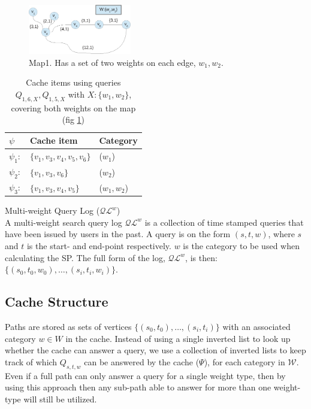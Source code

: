 \begin{figure}[hbt]
  \center
        \includegraphics[width=0.4\textwidth]{figures/map1}
        \caption{Map1. Has a set of two weights on each edge, $w_1,w_2$.}
  \label{fig:map1}
\end{figure}

\begin{table}
\begin{tabular}{l|l|l}\hline
$\psi$		& Cache item 			& Category \\\hline  \hline
$\psi_1:$	& $\{v_1,v_3,v_4,v_5,v_6\}$ 	& ($w_1$)\\\hline
$\psi_2:$	& $\{v_1,v_3,v_6\}$ 		& ($w_2$)\\\hline
$\psi_3:$	& $\{v_1,v_3,v_4,v_5\}$ 	& ($w_1,w_2$)\\\hline
\end{tabular}
\caption{Cache items using queries $Q_{1,6,X}, Q_{1,5,X}$ with $X:\{w_1,w_2\}$, covering both weights on the map (fig \ref{fig:map1})}
\label{tab:expsi}
\end{table}


\begin{definition}{Multi-weight Query Log ($\mathcal{QL}^{w}$)}\\
A multi-weight search query log $\mathcal{QL}^w$ is a collection of time stamped queries that have been issued by users in the past.
A query is on the form $(s,t,w)$, where $s$ and $t$ is the start- and end-point respectively. $w$ is the category to be used when calculating the SP. The full form of the log, $\mathcal{QL}^{w}$,  is then: $\{(s_0,t_0,w_0),\dots,(s_i,t_i,w_i)\}$.
\end{definition}



\subsection{Cache Structure}

Paths are stored as sets of vertices $\{(s_0,t_0),\dots,(s_i,t_i)\}$ with an associated category $w \in W$ in the cache. Instead of using a single inverted list to look up whether the cache can answer a query, we use a collection of inverted lists to keep track of which $Q_{s,t,w}$ can be answered by the cache ($\Psi$), for each category in $\mathcal{W}$.
Even if a full path can only answer a query for a single weight type, then by using this approach then any sub-path able to answer for more than one weight-type will still be utilized. 

